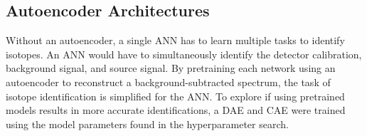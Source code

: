 
\subsection{Autoencoder Architectures}

Without an autoencoder, a single ANN has to learn multiple tasks to identify isotopes. An ANN would have to simultaneously identify the detector calibration, background signal, and source signal. By pretraining each network using an autoencoder to reconstruct a background-subtracted spectrum, the task of isotope identification is simplified for the ANN. To explore if using pretrained models results in more accurate identifications, a DAE and CAE were trained using the model parameters found in the hyperparameter search. 

